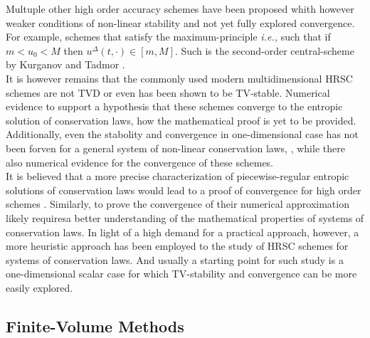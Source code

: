 \documentclass[11pt,a4paper,headinclude=true,DIV=14,BCOR=8mm,chapterprefix,listof=totoc,twoside,openright,abstracton]{scrbook}
\begin{document}
Multuple other high order accuracy schemes have been proposed whith however weaker conditions of non-linear stability and not yet fully explored convergence. For example, schemes that satisfy the maximum-principle \textit{i.e.,} such that if $m < u_0 < M$ then $u^{\Delta}(t,\cdot)\in[m, M]$. Such is the second-order central-scheme by Kurganov and Tadmor \cite{Kurganov:2000}. \\

It is however remains that the commonly used modern multidimensional HRSC schemes are not TVD or even has been shown to be TV-stable. Numerical evidence to support a hypothesis that these schemes converge to the entropic solution of conservation laws, how the mathematical proof is yet to be provided. Additionally, even the stabolity and convergence in one-dimensional case has not been forven for a general system of non-linear conservation laws, \cite{LeVeque:2002}, while there also numerical evidence for the convergence of these schemes. \\

It is believed that a more precise characterization of piecewise-regular entropic solutions of conservation laws would lead to a proof of convergence for high order schemes \cite{Tadmor1998}. Similarly, to prove the convergence of their numerical approximation likely requiresa  better understanding of the mathematical properties of systems of conservation laws. In light of a high demand for a practical approach, however, a more heuristic approach has been employed to the study of HRSC schemes for systems of conservation laws. And usually a starting point for such study is a one-dimensional scalar case for which TV-stability and convergence can be more easily explored.

\subsection{Finite-Volume Methods}
\end{document}

